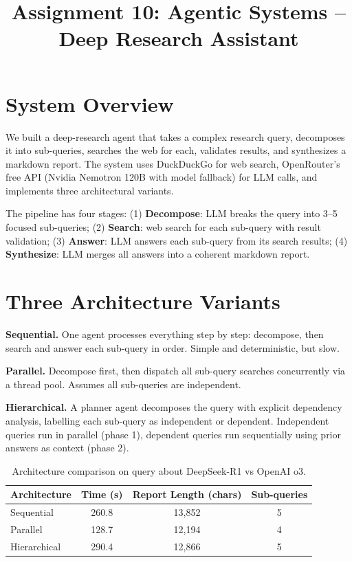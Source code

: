 \documentclass[11pt,a4paper]{article}
\title{Assignment 10: Agentic Systems -- Deep Research Assistant}
\author{}
\date{}
\begin{document}
\maketitle
\vspace{-1.5cm}

\section{System Overview}

We built a deep-research agent that takes a complex research query, decomposes it into sub-queries, searches the web for each, validates results, and synthesizes a markdown report. The system uses DuckDuckGo for web search, OpenRouter's free API (Nvidia Nemotron 120B with model fallback) for LLM calls, and implements three architectural variants.

The pipeline has four stages: (1) \textbf{Decompose}: LLM breaks the query into 3--5 focused sub-queries; (2) \textbf{Search}: web search for each sub-query with result validation; (3) \textbf{Answer}: LLM answers each sub-query from its search results; (4) \textbf{Synthesize}: LLM merges all answers into a coherent markdown report.

\section{Three Architecture Variants}

\textbf{Sequential.} One agent processes everything step by step: decompose, then search and answer each sub-query in order. Simple and deterministic, but slow.

\textbf{Parallel.} Decompose first, then dispatch all sub-query searches concurrently via a thread pool. Assumes all sub-queries are independent.

\textbf{Hierarchical.} A planner agent decomposes the query with explicit dependency analysis, labelling each sub-query as independent or dependent. Independent queries run in parallel (phase 1), dependent queries run sequentially using prior answers as context (phase 2).

\begin{table}[H]
\centering
\begin{tabular}{lccc}
\toprule
Architecture & Time (s) & Report Length (chars) & Sub-queries \\
\midrule
Sequential & 260.8 & 13,852 & 5 \\
Parallel & 128.7 & 12,194 & 4 \\
Hierarchical & 290.4 & 12,866 & 5 \\
\bottomrule
\end{tabular}
\caption{Architecture comparison on query about DeepSeek-R1 vs OpenAI o3.}
\end{table}
\end{document}
